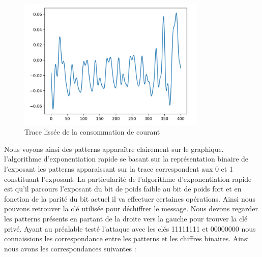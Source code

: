 \begin{figure}[H]
    \centering
    \includegraphics[width=0.8\textwidth]{fig/trace_tr.png}
    \caption{Trace lissée de la consommation de courant}
    \label{fig:trace_transforme}
\end{figure}
Nous voyons ainsi des patterns apparaître clairement sur le graphique.
l'algorithme d’exponentiation rapide se basant sur la représentation binaire de l'exposant les patterns apparaissant sur la trace correspondent aux 0 et 1 constituant l'exposant. La particularité de l’algorithme d'exponentiation rapide est qu'il parcours l'exposant du bit de poids faible au bit de poids fort et en fonction de la parité du bit actuel il va effectuer certaines opérations. Ainsi nous pouvons retrouver la clé utilisée pour déchiffrer le message.
Nous devons regarder les patterns présents en partant de la droite vers la gauche pour trouver la clé privé. Ayant au préalable testé l'attaque avec les clés 11111111 et 00000000 nous connaissions les correspondance entre les patterns et les chiffres binaires. Ainsi nous avons les correspondances suivantes :


